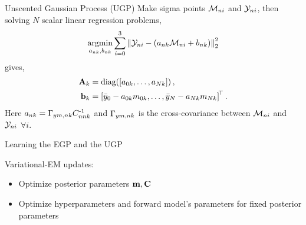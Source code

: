 \documentclass[final]{beamer}
\newlength{\onecolwid}
\begin{document}
\begin{frame}[t]
\begin{columns}[t]
\begin{column}{\onecolwid}
\begin{block}{Unscented Gaussian Process (UGP)}
Make sigma points \cite{Julier2004} $\Sfunc_{ni}$ and $\Sobs_{ni}$,
then solving $N$ scalar linear regression problems,
\begin{equation*}
    \argmin_{\Lins_{nk}, \intcpts_{nk}} \sum^{3}_{i=0} 
        \lnorm{2}{\Sobs_{ni} - \brac{\Lins_{nk}\Sfunc_{ni} + \intcpts_{nk}}}^2
\end{equation*}
gives,
\begin{align}
    \Linmat_k &= \diag{\sbrac{\Lins_{0k}, \ldots, \Lins_{Nk}}}, \\
    \intcpt_k &= \sbrac{\bar\obss_{0} - \Lins_{0k}\pomeans_{0k}, \ldots,
        \bar\obss_{N} - \Lins_{Nk}\pomeans_{Nk}}\transpose. \nonumber
\end{align}
Here $\Lins_{nk} = \xcovs_{\obss\pomeans,nk} \pocovs_{nnk}\inv$ and 
$\xcovs_{\obss\pomeans,nk}$ is the cross-covariance between $\Sfunc_{ni}$ 
and~$\Sobs_{ni}$ $\forall i$.

\end{block}






\begin{block}{Learning the EGP and the UGP}


Variational-EM updates:
\begin{itemize}
	\item
		Optimize posterior parameters $\pomean, \pocov$
	\item
		Optimize hyperparameters and forward model's parameters 
		for fixed posterior parameters
\end{itemize}
\end{block}






\end{column}
\end{columns}
\end{frame}
\end{document}
